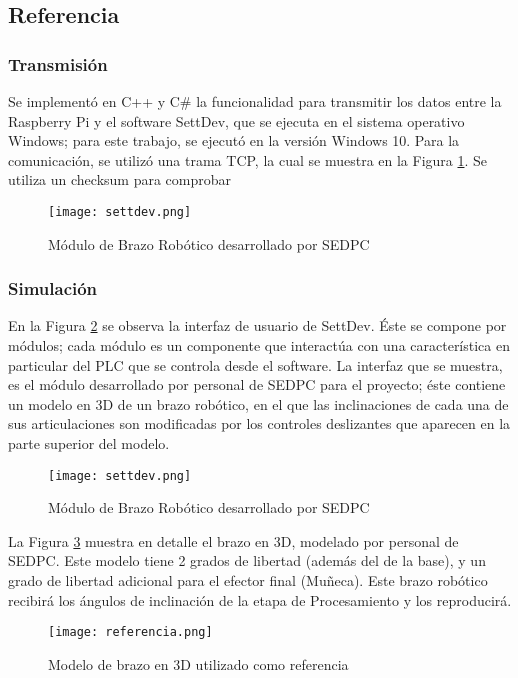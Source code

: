 \subsection{Referencia}

\subsubsection{Transmisión}

Se implementó en C++ y C\# la funcionalidad para transmitir los datos entre la Raspberry Pi y el software SettDev, que se ejecuta en el sistema operativo Windows; para este trabajo, se ejecutó en la versión Windows 10. Para la comunicación, se utilizó una trama TCP, la cual se muestra en la Figura \ref{fig:tramatcp}. Se utiliza un checksum para comprobar

\begin{figure}[htb]
	\centering
	\texttt{[image: settdev.png]}
	\caption{Módulo de Brazo Robótico desarrollado por SEDPC}
	\label{fig:tramatcp}
\end{figure}

\subsubsection{Simulación}

En la Figura \ref{fig:settdev} se observa la interfaz de usuario de SettDev. Éste se compone por módulos; cada módulo es un componente que interactúa con una característica en particular del PLC que se controla desde el software. La interfaz que se muestra, es el módulo desarrollado por personal de SEDPC para el proyecto; éste contiene un modelo en 3D de un brazo robótico, en el que las inclinaciones de cada una de sus articulaciones son modificadas por los controles deslizantes que aparecen en la parte superior del modelo.

\begin{figure}[htb]
	\centering
	\texttt{[image: settdev.png]}
	\caption{Módulo de Brazo Robótico desarrollado por SEDPC}
	\label{fig:settdev}
\end{figure}

La Figura \ref{fig:referencia} muestra en detalle el brazo en 3D, modelado por personal de SEDPC. Este modelo tiene 2 grados de libertad (además del de la base), y un grado de libertad adicional para el efector final (Muñeca). Este brazo robótico recibirá los ángulos de inclinación de la etapa de Procesamiento y los reproducirá.

\begin{figure}[htb]
	\centering
	\texttt{[image: referencia.png]}
	\caption{Modelo de brazo en 3D utilizado como referencia}
	\label{fig:referencia}
\end{figure}